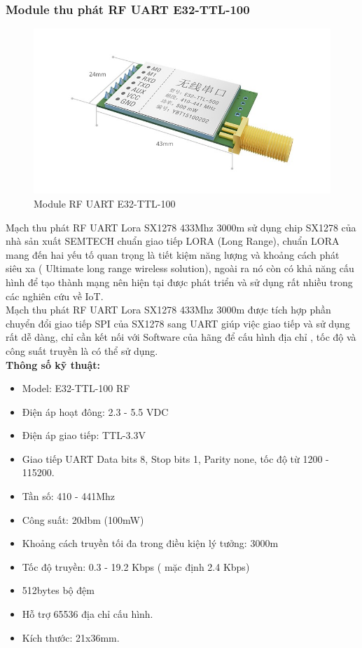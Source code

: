 \subsubsection{Module thu phát RF UART E32-TTL-100}
\begin{figure}[H]
	\centering
	\includegraphics[scale=.4]{Chapter 2/image chapter 2/E32.jpg}
	\caption[Module RF UART E32-TTL-100]{Module RF UART E32-TTL-100}
	\label{hinh22}
\end{figure}
Mạch thu phát RF UART Lora SX1278 433Mhz 3000m sử dụng chip SX1278 của nhà sản xuất SEMTECH chuẩn giao tiếp LORA (Long Range), chuẩn LORA mang đến hai yếu tố quan trọng là tiết kiệm năng lượng và khoảng cách phát siêu xa ( Ultimate long range wireless solution), ngoài ra nó còn có khả năng cấu hình để tạo thành mạng nên hiện tại được phát triển và sử dụng rất nhiều trong các nghiên cứu về IoT.\\
\indent Mạch thu phát RF UART Lora SX1278 433Mhz 3000m được tích hợp phần chuyển đổi giao tiếp SPI của SX1278 sang UART giúp việc giao tiếp và sử dụng rất dễ dàng, chỉ cần kết nối với Software của hãng để cấu hình địa chỉ , tốc độ và công suất truyền là có thể sử dụng.\\
\indent \textbf{Thông số kỹ thuật:}
\begin{itemize}
	\item Model: E32-TTL-100 RF
	\item Điện áp hoạt đông: 2.3 - 5.5 VDC
	\item Điện áp giao tiếp: TTL-3.3V
	\item Giao tiếp UART Data bits 8, Stop bits 1, Parity none, tốc độ từ 1200 - 115200.
	\item Tần số: 410 - 441Mhz
	\item Công suất: 20dbm (100mW)
	\item Khoảng cách truyền tối đa trong điều kiện lý tưởng: 3000m
	\item Tốc độ truyền: 0.3 - 19.2 Kbps ( mặc định 2.4 Kbps)
	\item 512bytes bộ đệm
	\item Hỗ trợ 65536 địa chỉ cấu hình.
	\item Kích thước: 21x36mm.
\end{itemize}
